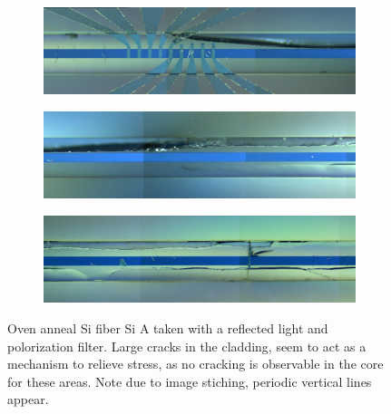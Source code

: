 \begin{figure}[h]
\centering
\begin{subfigure}{\textwidth}
  \centering
  \includegraphics[width=\linewidth]{fig/OA/dd35114_0A--01-1.jpg}
  \label{fig:sfig1}
\end{subfigure}%

\begin{subfigure}{\textwidth}
  \centering
  \includegraphics[width=\linewidth]{fig/OA/dd35114_0A--01-2.jpg}
  \label{fig:sfig2}
\end{subfigure}%

\begin{subfigure}{\textwidth}
  \centering
  \includegraphics[width=\linewidth]{fig/OA/dd35114_0A--01-3.jpg}
  \label{fig:sfig3}
\end{subfigure}
\caption{Oven anneal Si fiber Si A taken with a reflected light and polorization filter. Large cracks in the cladding, seem to act as a mechanism to relieve stress, as no cracking is observable in the core for these areas. Note due to image stiching, periodic vertical lines appear. }
\label{fig:si_sige}
\end{figure}


